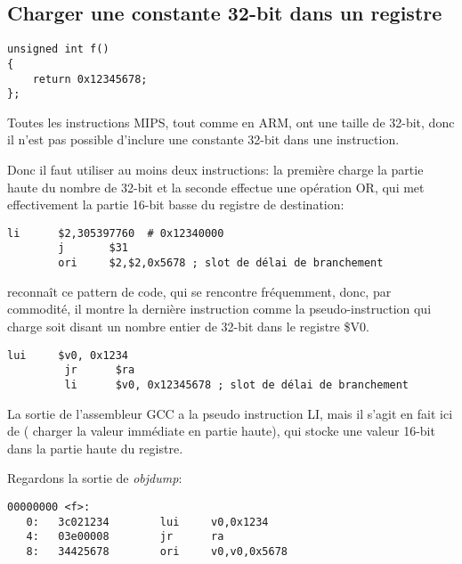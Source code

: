 ﻿\subsection{Charger une constante 32-bit dans un registre}
\label{MIPS_big_constants}

\begin{lstlisting}[style=customc]
unsigned int f()
{
	return 0x12345678;
};
\end{lstlisting}

Toutes les instructions MIPS, tout comme en ARM, ont une taille de 32-bit, donc il
n'est pas possible d'inclure une constante 32-bit dans une instruction.

Donc il faut utiliser au moins deux instructions:
la première charge la partie haute du nombre de 32-bit et la seconde effectue une
opération OR, qui met effectivement la partie 16-bit basse du registre de destination:

\begin{lstlisting}[caption=GCC 4.4.5 -O3 (\assemblyOutput),style=customasmMIPS]
        li      $2,305397760  # 0x12340000
        j       $31
        ori     $2,$2,0x5678 ; slot de délai de branchement
\end{lstlisting}

\IDA reconnaît ce pattern de code, qui se rencontre fréquemment, donc, par commodité,
il montre la dernière instruction  comme la pseudo-instruction  qui
charge soit disant un nombre entier de 32-bit dans le registre \$V0. %


\begin{lstlisting}[caption=GCC 4.4.5 -O3 (IDA),style=customasmMIPS]
         lui     $v0, 0x1234
         jr      $ra
         li      $v0, 0x12345678 ; slot de délai de branchement
\end{lstlisting}

La sortie de l'assembleur GCC a la pseudo instruction LI, mais il s'agit en fait
ici de  ( charger la valeur immédiate en partie
haute), qui stocke une valeur 16-bit dans la partie haute du registre.

Regardons la sortie de \emph{objdump}:

\begin{lstlisting}[caption=objdump,style=customasmMIPS]
00000000 <f>:
   0:   3c021234        lui     v0,0x1234
   4:   03e00008        jr      ra
   8:   34425678        ori     v0,v0,0x5678
\end{lstlisting}

